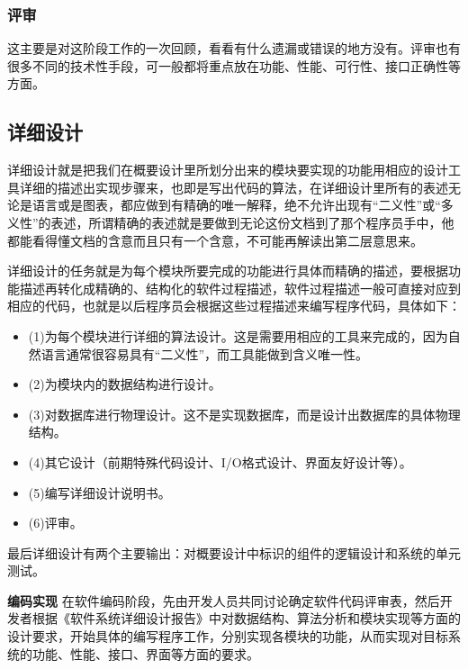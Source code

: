\documentclass[UTF8,nofonts]{ctexart}
\makeatletter
\renewcommand{\section}{\@startsection{section}{1}{0mm}
  {-\baselineskip}{0.5\baselineskip}{\fontsize{16pt}{16pt}\bf\leftline}}
\makeatother
\begin{document}
\subsubsection{评审}
这主要是对这阶段工作的一次回顾，看看有什么遗漏或错误的地方没有。评审也有很多不同的技术性手段，可一般都将重点放在功能、性能、可行性、接口正确性等方面。
\subsection{\textbf{详细设计}}
详细设计就是把我们在概要设计里所划分出来的模块要实现的功能用相应的设计工具详细的描述出实现步骤来，也即是写出代码的算法，在详细设计里所有的表述无论是语言或是图表，都应做到有精确的唯一解释，绝不允许出现有“二义性”或“多义性”的表述，所谓精确的表述就是要做到无论这份文档到了那个程序员手中，他都能看得懂文档的含意而且只有一个含意，不可能再解读出第二层意思来。

详细设计的任务就是为每个模块所要完成的功能进行具体而精确的描述，要根据功能描述再转化成精确的、结构化的软件过程描述，软件过程描述一般可直接对应到相应的代码，也就是以后程序员会根据这些过程描述来编写程序代码，具体如下：
\begin{itemize}
\setlength{\itemsep}{0pt}
\setlength{\parskip}{0pt}
\setlength{\parsep}{0pt}
\item (1)为每个模块进行详细的算法设计。这是需要用相应的工具来完成的，因为自然语言通常很容易具有“二义性”，而工具能做到含义唯一性。
\item	(2)为模块内的数据结构进行设计。
\item	(3)对数据库进行物理设计。这不是实现数据库，而是设计出数据库的具体物理结构。
\item	(4)其它设计（前期特殊代码设计、I/O格式设计、界面友好设计等）。
\item	(5)编写详细设计说明书。
\item	(6)评审。
\end{itemize}

最后详细设计有两个主要输出：对概要设计中标识的组件的逻辑设计和系统的单元测试。
\section{\textbf{编码实现}}
在软件编码阶段，先由开发人员共同讨论确定软件代码评审表，然后开发者根据《软件系统详细设计报告》中对数据结构、算法分析和模块实现等方面的设计要求，开始具体的编写程序工作，分别实现各模块的功能，从而实现对目标系统的功能、性能、接口、界面等方面的要求。
\end{document}
